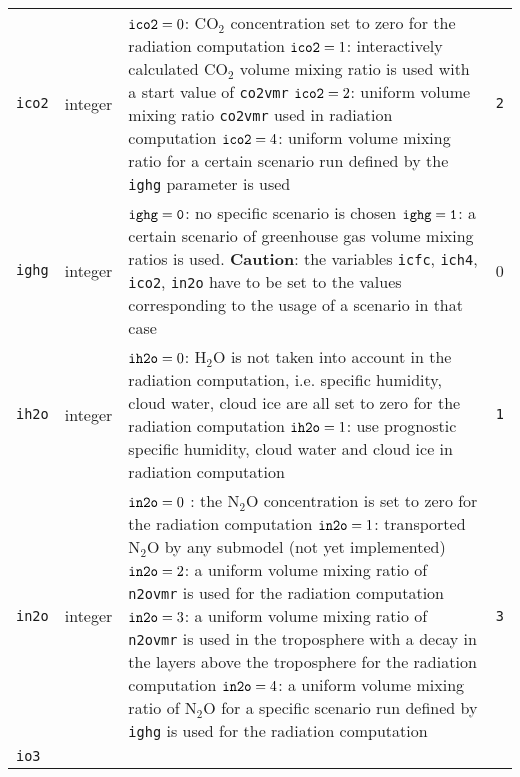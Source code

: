 \begin{longtable}{l@{\extracolsep\fill}lp{7cm}p{3.5cm}}
{\tt ico2}\index{namelist variables!ico2}
 & integer &  ${\tt ico2} = 0$: CO$_2$ concentration set to
zero for the
  radiation computation\newline 
  ${\tt ico2} = 1$: interactively calculated CO$_2$ volume mixing
  ratio is used with a start value of {\tt co2vmr} \newline
  ${\tt ico2} = 2$: uniform volume mixing ratio {\tt co2vmr} used in radiation
  computation\newline 
  ${\tt ico2} = 4$: uniform volume mixing ratio for a certain scenario run
  defined by the {\tt ighg} parameter is used & {\tt 2} \\
{\tt ighg}\index{namelist variables!ighg}
 & integer &     {$\tt ighg = 0$}: no specific scenario is
  chosen\newline 
                   {$\tt ighg = 1$}: a certain scenario of greenhouse
                   gas volume mixing ratios is used. {\bf Caution}:
                   the variables {\tt icfc}, {\tt ich4}, {\tt ico2},
                   {\tt in2o} have to be set to the values
                   corresponding to the usage of a scenario in that
                   case & 0\\
{\tt ih2o}\index{namelist variables!ih2o}
 & integer & ${\tt ih2o} = 0$: H$_2$O is not taken into account in the
  radiation computation, i.e. specific humidity, cloud water, cloud ice
  are all set to zero for the radiation computation\newline
  ${\tt ih2o} = 1$: use prognostic specific humidity, cloud water and cloud ice
  in radiation computation & {\tt 1} \\
{\tt in2o}\index{namelist variables!in2o}
  &integer&  ${\tt in2o} = 0$ : the N$_2$O concentration is
  set to zero for 
  the radiation computation \newline
  ${\tt in2o} = 1$: transported N$_2$O by any submodel (not yet
  implemented) \newline
  ${\tt in2o} = 2$: a uniform volume mixing ratio of {\tt n2ovmr} is
  used for
  the radiation computation \newline
  ${\tt in2o} = 3$: a uniform volume mixing ratio of {\tt n2ovmr} is used in
  the troposphere with a decay in the layers above the troposphere for
  the radiation computation\newline
  ${\tt in2o} = 4$: a uniform volume mixing ratio of N$_2$O for a specific
  scenario run defined by {\tt ighg} is used for the radiation
  computation & {\tt 3} \\
{\tt io3}\index{namelist variables!io3}

\end{longtable}
